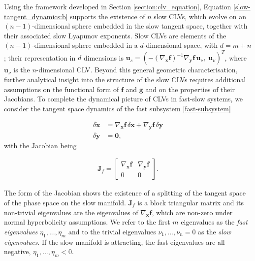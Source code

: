 \documentclass[aps,reprint,prx]{revtex4-2}
\begin{document}
Using the framework developed in Section \ref{section:clv_equation}, Equation \eqref{slow-tangent_dynamics:b} supports the existence of $n$ slow CLVs, which evolve on an $(n-1)$-dimensional sphere embedded in the slow tangent space, together with their associated slow Lyapunov exponents. Slow CLVs are elements of the $(n-1)$-dimensional sphere embedded in a $d$-dimensional space, with $d = m+n$; their representation in $d$ dimensions is $\mathbf{u}_{s}= \left(-(\nabla_\mathbf{x}\mathbf{f})^{-1}\nabla_\mathbf{y}\mathbf{f}\,\mathbf{u}_{\nu},\; \mathbf{u}_{\nu} \right)^{\!T}$, where $\mathbf{u}_{\nu}$ is the $n$-dimensional CLV. Beyond this general geometric characterisation, further analytical insight into the structure of the slow CLVs requires additional assumptions on the functional form of $\mathbf{f}$ and $\mathbf{g}$ and on the properties of their Jacobians.
To complete the dynamical picture of CLVs in fast-slow systems, we consider the tangent space dynamics of the fast subsystem \eqref{fast-subsystem}

\begin{equation} \label{fast-tangent_dynamics}
    \begin{aligned}
        \delta \dot{\mathbf{x}} &= \nabla_{\mathbf{x}}\mathbf{f} \,\delta \mathbf{x} + \nabla_{\mathbf{y}}\mathbf{f}\, \delta \mathbf{y} \\
        \delta\dot{\mathbf{y}} &= \mathbf{0},
    \end{aligned}
\end{equation}
with the Jacobian being 

\begin{align} \label{fast-slow jacobian}
\mathbf{J}_f =
\begin{bmatrix}
\nabla_\mathbf{x}\mathbf{f} & \nabla_\mathbf{y}\mathbf{f} \\
0 & 0
\end{bmatrix}.
\end{align}

The form of the Jacobian shows the existence of a splitting of the tangent space of the phase space on the slow manifold.  
$\mathbf{J}_f$ is a block triangular matrix and its non-trivial eigenvalues are the eigenvalues of $\nabla_\mathbf{x}\mathbf{f}$, which are non-zero under normal hyperbolicity assumptions. We refer to the first $m$ eigenvalues as the \textit{fast eigenvalues} $\eta_1, ..., \eta_m$ and to the trivial eigenvalues $\nu_{1},...,\nu_{n}=0$ as the \textit{slow eigenvalues}. If the slow manifold is attracting, the fast eigenvalues are all negative, $\eta_1,...,\eta_m < 0$. 
\end{document}
